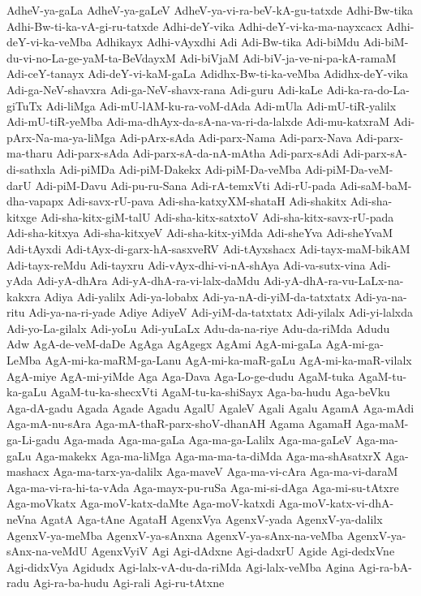 {AdheV-ya-gaLa
AdheV-ya-gaLeV
AdheV-ya-vi-ra-beV-kA-gu-tatxde
Adhi-Bw-tika
Adhi-Bw-ti-ka-vA-gi-ru-tatxde
Adhi-deY-vika
Adhi-deY-vi-ka-ma-nayxcacx
Adhi-deY-vi-ka-veMba
Adhikayx
Adhi-vAyxdhi
Adi
Adi-Bw-tika
Adi-biMdu
Adi-biM-du-vi-no-La-ge-yaM-ta-BeVdayxM
Adi-biVjaM
Adi-biV-ja-ve-ni-pa-kA-ramaM
Adi-ceY-tanayx
Adi-deY-vi-kaM-gaLa
Adidhx-Bw-ti-ka-veMba
Adidhx-deY-vika
Adi-ga-NeV-shavxra
Adi-ga-NeV-shavx-rana
Adi-guru
Adi-kaLe
Adi-ka-ra-do-La-giTuTx
Adi-liMga
Adi-mU-lAM-ku-ra-voM-dAda
Adi-mUla
Adi-mU-tiR-yalilx
Adi-mU-tiR-yeMba
Adi-ma-dhAyx-da-sA-na-va-ri-da-lalxde
Adi-mu-katxraM
Adi-pArx-Na-ma-ya-liMga
Adi-pArx-sAda
Adi-parx-Nama
Adi-parx-Nava
Adi-parx-ma-tharu
Adi-parx-sAda
Adi-parx-sA-da-nA-mAtha
Adi-parx-sAdi
Adi-parx-sA-di-sathxla
Adi-piMDa
Adi-piM-Dakekx
Adi-piM-Da-veMba
Adi-piM-Da-veM-darU
Adi-piM-Davu
Adi-pu-ru-Sana
Adi-rA-temxVti
Adi-rU-pada
Adi-saM-baM-dha-vapapx
Adi-savx-rU-pava
Adi-sha-katxyXM-shataH
Adi-shakitx
Adi-sha-kitxge
Adi-sha-kitx-giM-talU
Adi-sha-kitx-satxtoV
Adi-sha-kitx-savx-rU-pada
Adi-sha-kitxya
Adi-sha-kitxyeV
Adi-sha-kitx-yiMda
Adi-sheYva
Adi-sheYvaM
Adi-tAyxdi
Adi-tAyx-di-garx-hA-sasxveRV
Adi-tAyxshacx
Adi-tayx-maM-bikAM
Adi-tayx-reMdu
Adi-tayxru
Adi-vAyx-dhi-vi-nA-shAya
Adi-va-sutx-vina
Adi-yAda
Adi-yA-dhAra
Adi-yA-dhA-ra-vi-lalx-daMdu
Adi-yA-dhA-ra-vu-LaLx-na-kakxra
Adiya
Adi-yalilx
Adi-ya-lobabx
Adi-ya-nA-di-yiM-da-tatxtatx
Adi-ya-na-ritu
Adi-ya-na-ri-yade
Adiye
AdiyeV
Adi-yiM-da-tatxtatx
Adi-yilalx
Adi-yi-lalxda
Adi-yo-La-gilalx
Adi-yoLu
Adi-yuLaLx
Adu-da-na-riye
Adu-da-riMda
Adudu
Adw
AgA-de-veM-daDe
AgAga
AgAgegx
AgAmi
AgA-mi-gaLa
AgA-mi-ga-LeMba
AgA-mi-ka-maRM-ga-Lanu
AgA-mi-ka-maR-gaLu
AgA-mi-ka-maR-vilalx
AgA-miye
AgA-mi-yiMde
Aga
Aga-Dava
Aga-Lo-ge-dudu
AgaM-tuka
AgaM-tu-ka-gaLu
AgaM-tu-ka-shecxVti
AgaM-tu-ka-shiSayx
Aga-ba-hudu
Aga-beVku
Aga-dA-gadu
Agada
Agade
Agadu
AgalU
AgaleV
Agali
Agalu
AgamA
Aga-mAdi
Aga-mA-nu-sAra
Aga-mA-thaR-parx-shoV-dhanAH
Agama
AgamaH
Aga-maM-ga-Li-gadu
Aga-mada
Aga-ma-gaLa
Aga-ma-ga-Lalilx
Aga-ma-gaLeV
Aga-ma-gaLu
Aga-makekx
Aga-ma-liMga
Aga-ma-ma-ta-diMda
Aga-ma-shAsatxrX
Aga-mashacx
Aga-ma-tarx-ya-dalilx
Aga-maveV
Aga-ma-vi-cAra
Aga-ma-vi-daraM
Aga-ma-vi-ra-hi-ta-vAda
Aga-mayx-pu-ruSa
Aga-mi-si-dAga
Aga-mi-su-tAtxre
Aga-moVkatx
Aga-moV-katx-daMte
Aga-moV-katxdi
Aga-moV-katx-vi-dhA-neVna
AgatA
Aga-tAne
AgataH
AgenxVya
AgenxV-yada
AgenxV-ya-dalilx
AgenxV-ya-meMba
AgenxV-ya-sAnxna
AgenxV-ya-sAnx-na-veMba
AgenxV-ya-sAnx-na-veMdU
AgenxVyiV
Agi
Agi-dAdxne
Agi-dadxrU
Agide
Agi-dedxVne
Agi-didxVya
Agidudx
Agi-lalx-vA-du-da-riMda
Agi-lalx-veMba
Agina
Agi-ra-bA-radu
Agi-ra-ba-hudu
Agi-rali
Agi-ru-tAtxne
}
